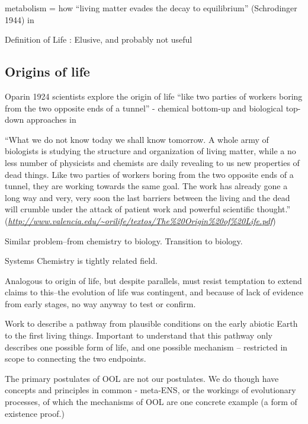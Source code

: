 	metabolism = how ``living matter evades the decay to equilibrium''
	(Schrodinger 1944) in \autocite{Pascal2013}
	
	Definition of Life  \autocite{Pascal2013}: Elusive, and probably not useful
	
	\subsection{Origins of life}
	
	Oparin 1924 scientists explore the origin of life ``like two parties
	of workers boring from the two opposite ends of a tunnel'' - chemical
	bottom-up and biological top-down approaches in \autocite{Pereto2012}
	
	``What we do not know today we shall know tomorrow. A
	whole army of biologists is studying the structure and organization of
	living matter, while a no less number of physicists and chemists are
	daily revealing to us new properties of dead things. Like two parties
	of workers boring from the two opposite ends of a tunnel, they are
	working towards the same goal. The work has already gone a long way
	and very, very soon the last barriers between the living and the dead
	will crumble under the attack of patient work and powerful scientific
	thought.'' (\href{http://www.valencia.edu/~orilife/textos/The\%20Origin\%20of\%20Life.pdf}{\emph{http://www.valencia.edu/\textasciitilde{}orilife/textos/The\%20Origin\%20of\%20Life.pdf}})
	
	Similar problem--from chemistry to biology. Transition to biology.
	
	Systems Chemistry is tightly related field.
	
	Analogous to origin of life, but despite parallels, must resist temptation to extend claims to this--the evolution of life was contingent, and because of lack of evidence from early stages, no way anyway to test or confirm.
	
	Work to describe a pathway from plausible conditions on the early abiotic Earth to the first living things. Important to understand that this pathway only describes one possible form of life, and one possible mechanism -- restricted in scope to connecting the two endpoints.
	
	The primary postulates of OOL are not our postulates. We do though have concepts and principles in common - meta-ENS, or the workings of evolutionary processes, of which the mechanisms of OOL are one concrete example (a form of existence proof.)
	

